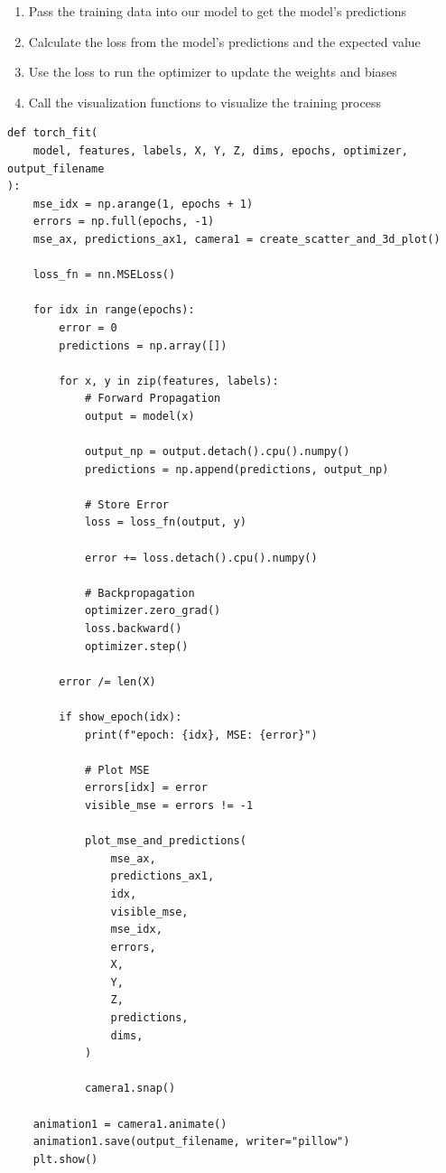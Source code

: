 \documentclass[openany]{book}
\providecommand{\tightlist}{%
      \setlength{\itemsep}{0pt}\setlength{\parskip}{0pt}}
\begin{document}
\begin{enumerate}
\def\labelenumi{\arabic{enumi}.}
\tightlist
\item
  Pass the training data into our model to get the model's predictions
\item
  Calculate the loss from the model's predictions and the expected value
\item
  Use the loss to run the optimizer to update the weights and biases
\item
  Call the visualization functions to visualize the training process
\end{enumerate}

\begin{tcolorbox}
\tiny
\begin{verbatim}
def torch_fit(
    model, features, labels, X, Y, Z, dims, epochs, optimizer, output_filename
):
    mse_idx = np.arange(1, epochs + 1)
    errors = np.full(epochs, -1)
    mse_ax, predictions_ax1, camera1 = create_scatter_and_3d_plot()

    loss_fn = nn.MSELoss()

    for idx in range(epochs):
        error = 0
        predictions = np.array([])

        for x, y in zip(features, labels):
            # Forward Propagation
            output = model(x)

            output_np = output.detach().cpu().numpy()
            predictions = np.append(predictions, output_np)

            # Store Error
            loss = loss_fn(output, y)

            error += loss.detach().cpu().numpy()

            # Backpropagation
            optimizer.zero_grad()
            loss.backward()
            optimizer.step()

        error /= len(X)

        if show_epoch(idx):
            print(f"epoch: {idx}, MSE: {error}")

            # Plot MSE
            errors[idx] = error
            visible_mse = errors != -1

            plot_mse_and_predictions(
                mse_ax,
                predictions_ax1,
                idx,
                visible_mse,
                mse_idx,
                errors,
                X,
                Y,
                Z,
                predictions,
                dims,
            )

            camera1.snap()

    animation1 = camera1.animate()
    animation1.save(output_filename, writer="pillow")
    plt.show()
\end{verbatim}
\end{tcolorbox}
\end{document}
